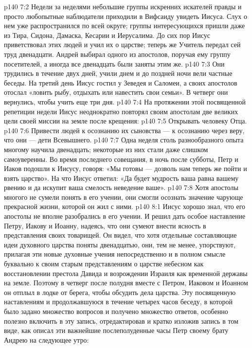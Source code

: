 \vs p140 7:2 \pc Недели за неделями небольшие группы искренних искателей правды и просто любопытные наблюдатели приходили в Вифсаиду увидеть Иисуса. Слух о нем уже распространился по всей округе; группы интересующихся пришли даже из Тира, Сидона, Дамаска, Кесарии и Иерусалима. До сих пор Иисус приветствовал этих людей и учил их о царстве; теперь же Учитель передал сей труд двенадцати. Андрей выбирал одного из апостолов, поручая ему группу посетителей, а иногда все двенадцать были заняты этим же.
\vs p140 7:3 Они трудились в течение двух дней, учили днем и до поздней ночи вели частные беседы. На третий день Иисус гостил у Зеведея и Саломеи, а своих апостолов отослал «ловить рыбу, отдыхать или навестить свои семьи». В четверг они вернулись, чтобы учить еще три дня.
\vs p140 7:4 На протяжении этой посвященной репетиции недели Иисус неоднократно повторял своим апостолам две великих цели своей миссии на земле после крещения:
\vs p140 7:5 \bibnobreakspace Открывать человеку Отца.
\vs p140 7:6 \bibnobreakspace Привести людей к осознанию их сыновства --- к осознанию через веру, что они --- дети Всевышнего.
\vs p140 7:7 \pc Одна неделя столь разнообразного опыта многому научила двенадцать; некоторые из них стали даже слишком самоуверенны. Во время последнего совещания, в ночь после субботы, Петр и Иаков подошли к Иисусу, говоря: «Мы готовы --- дозволь нам теперь же пойти и взять царство». На что Иисус ответил: «Да будет мудрость ваша равна вашему рвению и да искупит ваша смелость неведение ваше».
\vs p140 7:8 Хотя апостолы многого не сумели понять в его учении, они смогли осознать значение чарующе прекрасной жизни, которой он жил с ними.
\vs p140 8:1 Иисус хорошо знал, что его апостолы не вполне разобрались в его учении. И решил дать особое наставление Петру, Иакову и Иоанну, надеясь, что они сумеют внести ясность в представления своих товарищей. Он видел, что хотя отдельные составляющие идеи духовного царства поняты двенадцатью, они, тем не менее, упорствуют, прилагая эти новые духовные учения непосредственно и в полном смысле буквально к своим старым представлениям о царстве небесном как восстановлении престола Давида и возрождении Израиля как временной державы на земле. Поэтому в четверг после полудня вместе с Петром, Иаковом и Иоанном он отплыл в лодке от берега, чтобы обсудить дела царства. Эту посвященную наставлениям и продолжавшуюся в течение четырех часов беседу, в которой было задано множество вопросов и получено множество ответов, особенно полезно включить в эту запись, отредактировав и кратко изложив запись в том виде, как описал эти важнейшие послеполуденные часы Петр своему брату Андрею на следующее утро:
